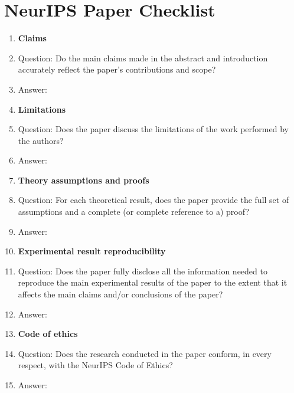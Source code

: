 
\section*{NeurIPS Paper Checklist}

\begin{enumerate}

\item {\bf Claims}
    \item[] Question: Do the main claims made in the abstract and introduction accurately reflect the paper's contributions and scope?
    \item[] Answer: \answerYes{}

\item {\bf Limitations}
    \item[] Question: Does the paper discuss the limitations of the work performed by the authors?
    \item[] Answer: \answerYes{}

\item {\bf Theory assumptions and proofs}
    \item[] Question: For each theoretical result, does the paper provide the full set of assumptions and a complete (or complete reference to a) proof?
    \item[] Answer: \answerYes{}

\item {\bf Experimental result reproducibility}
    \item[] Question: Does the paper fully disclose all the information needed to reproduce the main experimental results of the paper to the extent that it affects the main claims and/or conclusions of the paper?
    \item[] Answer: \answerTODO{}

\item {\bf Code of ethics}
    \item[] Question: Does the research conducted in the paper conform, in every respect, with the NeurIPS Code of Ethics?
    \item[] Answer: \answerYes{}

\end{enumerate}
